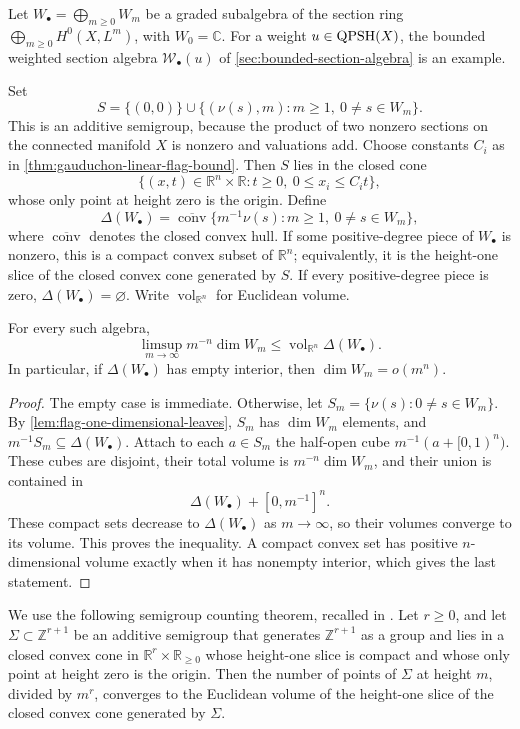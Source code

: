 Let $W_\bullet=\bigoplus_{m\geq0}W_m$ be a graded subalgebra of the section ring $\bigoplus_{m\geq0}H^0(X,L^m)$, with $W_0=\mathbb C$. For a weight $u\in\mathrm{QPSH}(X)$, the bounded weighted section algebra $\mathcal W_\bullet(u)$ of \cref{sec:bounded-section-algebra} is an example.

Set
\[
 S=\{(0,0)\}\cup
       \{(\nu(s),m):m\geq1,\ 0\neq s\in W_m\}.
\]
This is an additive semigroup, because the product of two nonzero sections on the connected manifold $X$ is nonzero and valuations add. Choose constants $C_i$ as in \cref{thm:gauduchon-linear-flag-bound}. Then $S$ lies in the closed cone
\[
 \{(x,t)\in\mathbb R^n\times\mathbb R:t\geq0,\ 0\leq x_i\leq C_i t\},
\]
whose only point at height zero is the origin. Define
\[
 \Delta(W_\bullet)=
 \overline{\operatorname{conv}}
 \{m^{-1}\nu(s):m\geq1,\ 0\neq s\in W_m\},
\]
where $\overline{\operatorname{conv}}$ denotes the closed convex hull. If some positive-degree piece of $W_\bullet$ is nonzero, this is a compact convex subset of $\mathbb R^n$; equivalently, it is the height-one slice of the closed convex cone generated by $S$. If every positive-degree piece is zero, $\Delta(W_\bullet)=\varnothing$. Write $\operatorname{vol}_{\mathbb R^n}$ for Euclidean volume.

\begin{proposition}\label{prop:flag-body-upper-count}
For every such algebra,
\[
 \limsup_{m\to\infty}m^{-n}\dim W_m
 \leq\operatorname{vol}_{\mathbb R^n}\Delta(W_\bullet).
\]
In particular, if $\Delta(W_\bullet)$ has empty interior, then $\dim W_m=o(m^n)$.
\end{proposition}
\begin{proof}
The empty case is immediate. Otherwise, let $S_m=\{\nu(s):0\neq s\in W_m\}$. By \cref{lem:flag-one-dimensional-leaves}, $S_m$ has $\dim W_m$ elements, and $m^{-1}S_m\subseteq\Delta(W_\bullet)$. Attach to each $a\in S_m$ the half-open cube $m^{-1}(a+[0,1)^n)$. These cubes are disjoint, their total volume is $m^{-n}\dim W_m$, and their union is contained in
\[
 \Delta(W_\bullet)+[0,m^{-1}]^n.
\]
These compact sets decrease to $\Delta(W_\bullet)$ as $m\to\infty$, so their volumes converge to its volume. This proves the inequality. A compact convex set has positive $n$-dimensional volume exactly when it has nonempty interior, which gives the last statement.
\end{proof}

We use the following semigroup counting theorem, recalled in \cite[Theorem~C.2.1]{SGPT}. Let $r\geq0$, and let $\Sigma\subset\mathbb Z^{r+1}$ be an additive semigroup that generates $\mathbb Z^{r+1}$ as a group and lies in a closed convex cone in $\mathbb R^r\times\mathbb R_{\geq0}$ whose height-one slice is compact and whose only point at height zero is the origin. Then the number of points of $\Sigma$ at height $m$, divided by $m^r$, converges to the Euclidean volume of the height-one slice of the closed convex cone generated by $\Sigma$.

